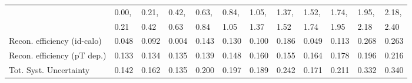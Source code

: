 \begin{tabular}{l|p{0.6cm}p{0.6cm}p{0.6cm}p{0.6cm}p{0.6cm}p{0.6cm}p{0.6cm}p{0.6cm}p{0.6cm}p{0.6cm}p{0.6cm}}
\hline
   & 0.00, & 0.21, & 0.42, & 0.63, & 0.84, & 1.05, & 1.37, & 1.52, & 1.74, & 1.95, & 2.18,  \\ 
   & 0.21 & 0.42 & 0.63 & 0.84 & 1.05 & 1.37 & 1.52 & 1.74 & 1.95 & 2.18 & 2.40  \\ 
\hline
Recon. efficiency (id-calo)              & 0.048 & 0.092 & 0.004 & 0.143 & 0.130 & 0.100 & 0.186 & 0.049 & 0.113 & 0.268 & 0.263 \\
\hline
Recon. efficiency (pT dep.)              & 0.133 & 0.134 & 0.135 & 0.139 & 0.148 & 0.160 & 0.155 & 0.164 & 0.178 & 0.196 & 0.216 \\
\hline
Tot. Syst. Uncertainty                   & 0.142 & 0.162 & 0.135 & 0.200 & 0.197 & 0.189 & 0.242 & 0.171 & 0.211 & 0.332 & 0.340 \\
\hline
\end{tabular}
